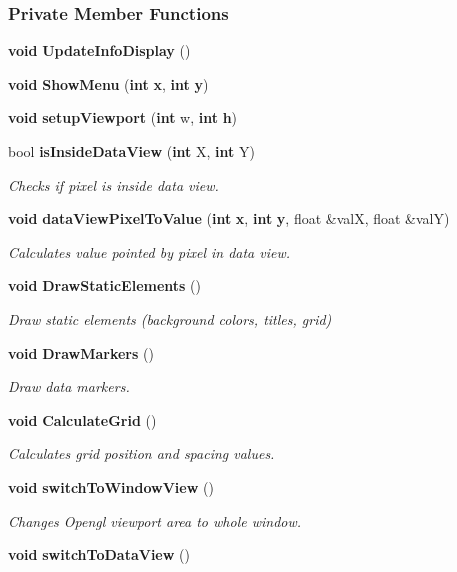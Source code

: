 \subsubsection*{Private Member Functions}
\begin{DoxyCompactItemize}
\item 
{\bf void} {\bf Update\+Info\+Display} ()
\item 
{\bf void} {\bf Show\+Menu} ({\bf int} {\bf x}, {\bf int} {\bf y})
\item 
{\bf void} {\bf setup\+Viewport} ({\bf int} w, {\bf int} {\bf h})
\item 
bool {\bf is\+Inside\+Data\+View} ({\bf int} X, {\bf int} Y)
\begin{DoxyCompactList}\small\item\em Checks if pixel is inside data view. \end{DoxyCompactList}\item 
{\bf void} {\bf data\+View\+Pixel\+To\+Value} ({\bf int} {\bf x}, {\bf int} {\bf y}, float \&valX, float \&valY)
\begin{DoxyCompactList}\small\item\em Calculates value pointed by pixel in data view. \end{DoxyCompactList}\item 
{\bf void} {\bf Draw\+Static\+Elements} ()
\begin{DoxyCompactList}\small\item\em Draw static elements (background colors, titles, grid) \end{DoxyCompactList}\item 
{\bf void} {\bf Draw\+Markers} ()
\begin{DoxyCompactList}\small\item\em Draw data markers. \end{DoxyCompactList}\item 
{\bf void} {\bf Calculate\+Grid} ()
\begin{DoxyCompactList}\small\item\em Calculates grid position and spacing values. \end{DoxyCompactList}\item 
{\bf void} {\bf switch\+To\+Window\+View} ()
\begin{DoxyCompactList}\small\item\em Changes Opengl viewport area to whole window. \end{DoxyCompactList}\item 
{\bf void} {\bf switch\+To\+Data\+View} ()

\end{DoxyCompactItemize}
